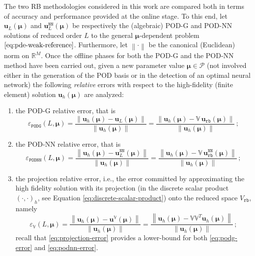 \documentclass[12pt, a4paper, twoside, openright]{report}
\numberwithin{equation}{chapter}
\theoremstyle{theorem}
\theoremstyle{definition}
\theoremstyle{remark}
\theoremstyle{proposition}
\numberwithin{figure}{chapter}
\newcommand{\norm}[1]{\left\lVert#1\right\rVert}
\newcommand{\bg}[1]{\boldsymbol{#1}}
\begin{document}
		The two RB methodologies considered in this work are compared both in terms of accuracy and performance provided at the online stage. To this end, let $\mathbf{u}_L(\bg{\mu})$ and $\mathbf{u}_L^{\texttt{NN}}(\bg{\mu})$ be respectively the (algebraic) POD-G and POD-NN solutions of reduced order $L$ to the general $\bg{\mu}$-dependent problem $\eqref{eq:pde-weak-reference}$. Furthermore, let $\norm{\cdot}$ be the canonical (Euclidean) norm on $\mathbb{R}^M$. Once the offline phases for both the POD-G and the POD-NN method have been carried out, given a new parameter value $\bg{\mu} \in \mathcal{P}$ (not involved either in the generation of the POD basis or in the detection of an optimal neural network) the following \emph{relative} errors with respect to the high-fidelity (finite element) solution $\mathbf{u}_h(\bg{\mu})$ are analyzed:
		\begin{enumerate}[label=(\alph*)]
			\item the POD-G relative error, that is
			\begin{equation}
				\label{eq:podg-error}
				\varepsilon_{\texttt{PODG}}^{}(L, \bg{\mu}) = \dfrac{\norm{\mathbf{u}_h(\bg{\mu}) - \mathbf{u}_L(\bg{\mu})}}{\norm{\mathbf{u}_h(\bg{\mu})}} = \dfrac{\norm{\mathbf{u}_h(\bg{\mu}) - \mathbb{V} \, \mathbf{u}_{\texttt{rb}}(\bg{\mu})}}{\norm{\mathbf{u}_h(\bg{\mu})}} \, ;
			\end{equation} 
			\item the POD-NN relative error, that is
			\begin{equation}
				\label{eq:podnn-error}
				\varepsilon_{\texttt{PODNN}}^{}(L, \bg{\mu}) = \dfrac{\norm{\mathbf{u}_h(\bg{\mu}) - \mathbf{u}_L^{\texttt{NN}}(\bg{\mu})}}{\norm{\mathbf{u}_h(\bg{\mu})}} = \dfrac{\norm{\mathbf{u}_h(\bg{\mu}) - \mathbb{V} \, \mathbf{u}_{\texttt{rb}}^{\texttt{NN}}(\bg{\mu})}}{\norm{\mathbf{u}_h(\bg{\mu})}} \, ;
			\end{equation} 
			\item the projection relative error, i.e., the error committed by approximating the high fidelity solution with its projection (in the discrete scalar product $(\cdot,\cdot)_h$, see Equation \eqref{eq:discrete-scalar-product}) onto the reduced space $V_{\texttt{rb}}$, namely
			\begin{equation}
				\label{eq:projection-error}
				\varepsilon_{\mathbb{V}}^{}(L, \bg{\mu}) = \dfrac{\norm{\mathbf{u}_h(\bg{\mu}) - \mathbf{u}^{\mathbb{V}}(\bg{\mu})}}{\norm{\mathbf{u}_h(\bg{\mu})}} = \dfrac{\norm{\mathbf{u}_h(\bg{\mu}) - \mathbb{V} \mathbb{V}^T \mathbf{u}_h(\bg{\mu})}}{\norm{\mathbf{u}_h(\bg{\mu})}} \, ;
			\end{equation}
			recall that \eqref{eq:projection-error} provides a lower-bound for both \eqref{eq:podg-error} and \eqref{eq:podnn-error}. 
		\end{enumerate}
\end{document}
